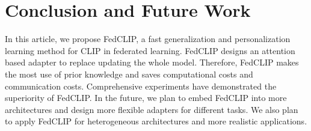 \documentclass[11pt]{article}
\newcommand{\entity}{\mathcal{E}}
\newcommand{\relation}{\mathcal{R}}
\newcommand{\lang}{\mathcal{L}}
\newcommand{\model}{\mathcal{M}}
\newcommand{\method}{FedCLIP\xspace}
\begin{document}

\section{Conclusion and Future Work}
\label{sec:concl}
In this article, we propose \method, a fast generalization and personalization learning method for CLIP in federated learning.
\method designs an attention based adapter to replace updating the whole model.
Therefore, \method makes the most use of prior knowledge and saves computational costs and communication costs.
Comprehensive experiments have demonstrated the superiority of \method.
In the future, we plan to embed \method into more architectures and design more flexible adapters for different tasks.
We also plan to apply \method for heterogeneous architectures and more realistic applications.




\end{document}

